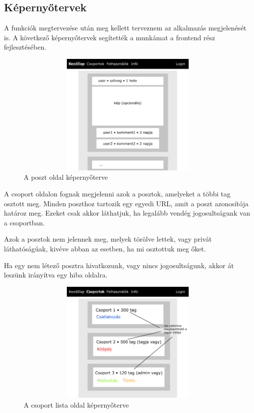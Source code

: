 \documentclass[
]{thesis-ekf}
\theoremstyle{definition}
\theoremstyle{remark}
\begin{document}
\newpage 
\subsection{Képernyőtervek}

A funkciók megtervezése után meg kellett terveznem az alkalmazás megjelenését is. A következő képernyőtervek segítették a munkámat a frontend rész fejlesztésében.

\begin{figure}[H]
	\centering
	\includegraphics[width=12cm, height=6cm]{kepernyoterv1}
	\caption{A poszt oldal képernyőterve}
	\label{fig:picture}
\end{figure}

A csoport oldalon fognak megjelenni azok a posztok, amelyeket a többi tag osztott meg. Minden poszthoz tartozik egy egyedi URL, amit a poszt azonosítója határoz meg. Ezeket csak akkor láthatjuk, ha legalább vendég jogosultságunk van a csoportban. 

Azok a posztok nem jelennek meg, melyek törölve lettek, vagy privát láthatóságúak, kivéve abban az esetben, ha mi osztottuk meg őket.

Ha egy nem létező posztra hivatkozunk, vagy nincs jogosultságunk, akkor át leszünk irányítva egy hiba oldalra.

\begin{figure}[H]
	\centering
	\includegraphics[width=12cm, height=6cm]{kepernyoterv2}
	\caption{A csoport lista oldal képernyőterve}
	\label{fig:picture}
\end{figure}
\end{document}
